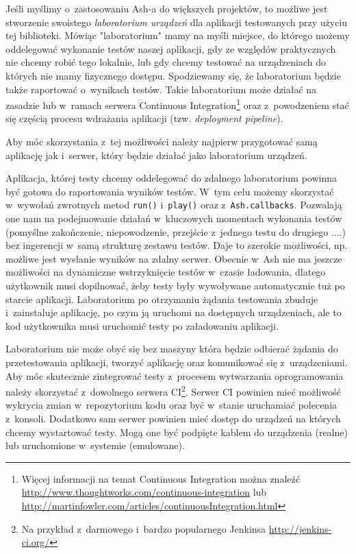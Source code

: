 \documentclass{xmgr}
\begin{document}
Jeśli myślimy o~zastosowaniu Ash-a do większych projektów, to możliwe jest stworzenie swoistego \textit{laboratorium urządzeń} dla aplikacji testowanych przy użyciu tej biblioteki. Mówiąc "laboratorium" mamy na myśli miejsce, do którego możemy oddelegować wykonanie testów naszej aplikacji, gdy ze względów praktycznych nie chcemy robić tego lokalnie, lub gdy chcemy testować na urządzeniach do których nie mamy fizycznego dostępu. Spodziewamy się, że laboratorium będzie także raportować o~wynikach testów. Takie laboratorium może działać na zasadzie lub w~ramach serwera Continuous Integration\footnote{ Więcej informacji na temat Continuous Integration można znaleźć \url{http://www.thoughtworks.com/continuous-integration} lub \url{http://martinfowler.com/articles/continuousIntegration.html} } oraz z~powodzeniem stać się częścią procesu wdrażania aplikacji (tzw. \textit{deployment pipeline}).

Aby móc skorzystania z~tej możliwości należy najpierw przygotować samą aplikację jak i~serwer, który będzie działać jako laboratorium urządzeń. 

Aplikacja, której testy chcemy oddelegować do zdalnego laboratorium powinna być gotowa do raportowania wyników testów. W~tym celu możemy skorzystać w~wywołań zwrotnych metod \texttt{run()} i~\texttt{play()} oraz z~\texttt{Ash.callbacks}. Pozwalają one nam na podejmowanie działań w~kluczowych momentach wykonania testów (pomyślne zakończenie, niepowodzenie, przejście z~jednego testu do drugiego ....) bez ingerencji w~samą strukturę zestawu testów. Daje to szerokie możliwości, np. możliwe jest wysłanie wyników na zdalny serwer. Obecnie w~Ash nie ma jeszcze możliwości na dynamiczne wstrzyknięcie testów w~czasie ładowania, dlatego użytkownik musi dopilnować, żeby testy były wywoływane automatycznie tuż po starcie aplikacji. Laboratorium po otrzymaniu żądania testowania zbuduje i~zainstaluje aplikację, po czym ją uruchomi na dostępnych urządzeniach, ale to kod użytkownika musi uruchomić testy po załadowaniu aplikacji.

Laboratorium nie może obyć się bez maszyny która będzie odbierać żądania do przetestowania aplikacji, tworzyć aplikację oraz komunikować się z~urządzeniami. Aby móc skutecznie zintegrować testy z~procesem wytwarzania oprogramowania należy skorzystać z~dowolnego serwera CI\footnote{ Na przykład z~darmowego i~bardzo popularnego Jenkinsa \url{ http://jenkins-ci.org/} }. Serwer CI powinien mieć możliwość wykrycia zmian w~repozytorium kodu oraz być w~stanie uruchamiać polecenia z~konsoli. Dodatkowo sam serwer powinien mieć dostęp do urządzeń na których chcemy wystartować testy. Mogą one być podpięte kablem do urządzenia (realne) lub uruchomione w~systemie (emulowane). 
\end{document}
